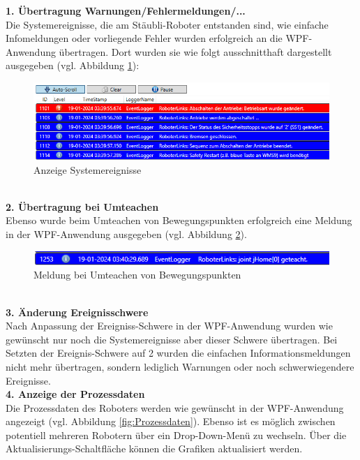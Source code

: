 \documentclass[ a4paper,
                oneside,
                toc=bibliography,
                toc=listof
                ]{scrbook}
\begin{document}
   	\textbf{1. Übertragung Warnungen/Fehlermeldungen/...}\\
   	Die Systemereignisse, die am Stäubli-Roboter entstanden sind, wie einfache Infomeldungen oder vorliegende Fehler wurden erfolgreich an die WPF-Anwendung übertragen. Dort wurden sie wie folgt ausschnitthaft dargestellt ausgegeben (vgl. Abbildung \ref{fig:AnzeigeEvents}):
   	\begin{figure}[!ht]
   		\centering
   		\includegraphics[width=1\linewidth]{./images/Fehlermeldung.png}
   		\caption{Anzeige Systemereignisse}
   		\label{fig:AnzeigeEvents}
   	\end{figure}\\
   	\textbf{2. Übertragung bei Umteachen}\\
   	Ebenso wurde beim Umteachen von Bewegungspunkten erfolgreich eine Meldung in der WPF-Anwendung ausgegeben (vgl. Abbildung \ref{fig:Umteachen}).
   	\begin{figure}[!ht]
   		\centering
   		\includegraphics[width=1\linewidth]{./images/Umteachen.png}
   		\caption{Meldung bei Umteachen von Bewegungspunkten}
   		\label{fig:Umteachen}
   	\end{figure}\\
   	\textbf{3. Änderung Ereignisschwere}\\
   	Nach Anpassung der Ereigniss-Schwere in der WPF-Anwendung wurden wie gewünscht nur noch die Systemereignisse aber dieser Schwere übertragen. Bei Setzten der Ereignis-Schwere auf 2 wurden die einfachen Informationsmeldungen nicht mehr übertragen, sondern lediglich Warnungen oder noch schwerwiegendere Ereignisse.\\
   	\textbf{4. Anzeige der Prozessdaten}\\
   	Die Prozessdaten des Roboters werden wie gewünscht in der WPF-Anwendung angezeigt (vgl. Abbildung \ref{fig:Prozessdaten}). Ebenso ist es möglich zwischen potentiell mehreren Robotern über ein Drop-Down-Menü zu wechseln. Über die Aktualisierungs-Schaltfläche können die Grafiken aktualisiert werden.
\end{document}
